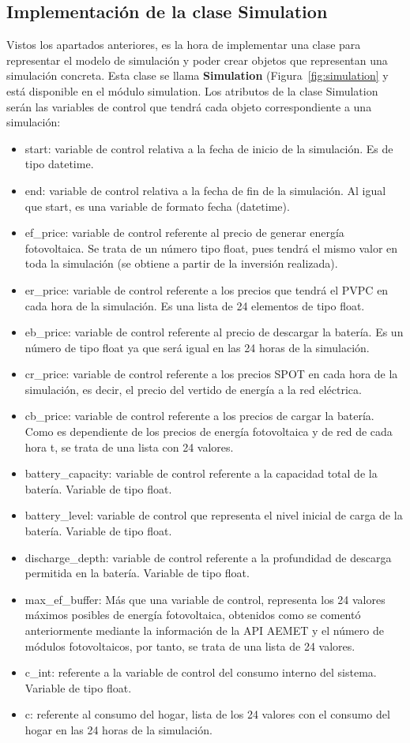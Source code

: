 \subsection{Implementación de la clase Simulation}
Vistos los apartados anteriores, es la hora de implementar una clase para representar el modelo de simulación y poder crear objetos que representan una simulación concreta. Esta clase se llama \textbf{Simulation} (Figura~\ref{fig:simulation} y está disponible en el módulo simulation. Los atributos de la clase Simulation serán las variables de control que tendrá cada objeto correspondiente a una simulación:
\begin{itemize}
        \item start: variable de control relativa a la fecha de inicio de la simulación. Es de tipo datetime.
        \item end: variable de control relativa a la fecha de fin de la simulación. Al igual que start, es una variable de formato fecha (datetime).
        \item ef\_price: variable de control referente al precio de generar energía fotovoltaica. Se trata de un número tipo float, pues tendrá el mismo valor en toda la simulación (se obtiene a partir de la inversión realizada).
        \item er\_price: variable de control referente a los precios que tendrá el \gls{PVPC} en cada hora de la simulación. Es una lista de 24 elementos de tipo float.
        \item eb\_price: variable de control referente al precio de descargar la batería. Es un número de tipo float ya que será igual en las 24 horas de la simulación.
        \item cr\_price: variable de control referente a los precios SPOT en cada hora de la simulación, es decir, el precio del vertido de energía a la red eléctrica.
        \item cb\_price: variable de control referente a los precios de cargar la batería. Como es dependiente de los precios de energía fotovoltaica y de red de cada hora t, se trata de una lista con 24 valores.
        \item battery\_capacity: variable de control referente a la capacidad total de la batería. Variable de tipo float.
        \item battery\_level: variable de control que representa el nivel inicial de carga de la batería. Variable de tipo float.
        \item discharge\_depth: variable de control referente a la profundidad de descarga permitida en la batería. Variable de tipo float.
        \item max\_ef\_buffer: Más que una variable de control, representa los 24 valores máximos posibles de energía fotovoltaica, obtenidos como se comentó anteriormente mediante la información de la API AEMET y el número de módulos fotovoltaicos, por tanto, se trata de una lista de 24 valores.
        \item c\_int: referente a la variable de control del consumo interno del sistema. Variable de tipo float.
        \item c: referente al consumo del hogar, lista de los 24 valores con el consumo del hogar en las 24 horas de la simulación.


\end{itemize}
